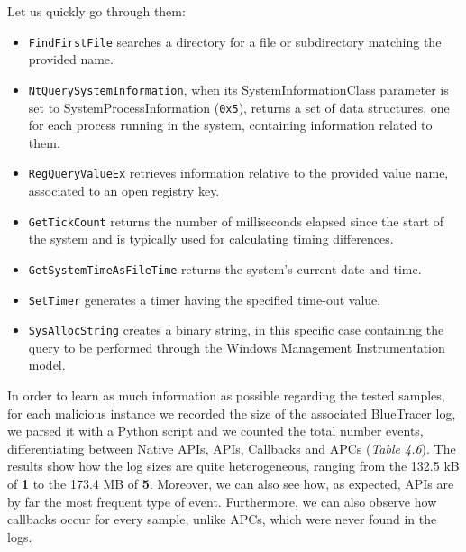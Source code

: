 Let us quickly go through them:
\begin{itemize}
\item \texttt{FindFirstFile} searches a directory for a file or subdirectory matching the provided name. 
\item \texttt{NtQuerySystemInformation}, when its SystemInformationClass parameter is set to SystemProcessInformation (\texttt{0x5}), returns a set of data structures, one for each process running in the system, containing information related to them.
\item \texttt{RegQueryValueEx} retrieves information relative to the provided value name, associated to an open registry key.
\item \texttt{GetTickCount} returns the number of milliseconds elapsed since the start of the system and is typically used for calculating timing differences.
\item \texttt{GetSystemTimeAsFileTime} returns the system's current date and time. 
\item \texttt{SetTimer} generates a timer having the specified time-out value.
\item \texttt{SysAllocString} creates a binary string, in this specific case containing the query to be performed through the Windows Management Instrumentation model.
\end{itemize}

In order to learn as much information as possible regarding the tested samples, for each malicious instance we recorded the size of the associated BlueTracer log, we parsed it with a Python script and we counted the total number events, differentiating between Native APIs, APIs, Callbacks and APCs (\textit{Table 4.6}). The results show how the log sizes are quite heterogeneous, ranging from the 132.5 kB of \textbf{1} to the 173.4 MB of \textbf{5}. Moreover, we can also see how, as expected, APIs are by far the most frequent type of event. Furthermore, we can also observe how callbacks occur for every sample, unlike APCs, which were never found in the logs.

